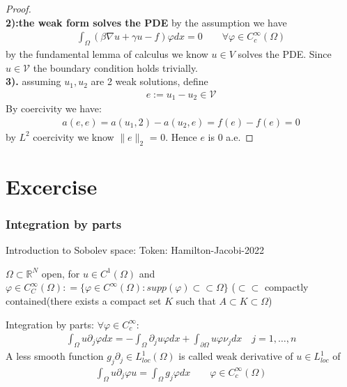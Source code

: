 \begin{proof}
\quad\\
\textbf{2):the weak form solves the PDE}
by the assumption we have
\begin{align*}
	\int_\Omega (\beta \nabla u + \gamma u - f) \varphi dx  = 0 \qquad \forall \varphi \in C_c^\infty(\Omega)
\end{align*}
by the fundamental lemma of calculus we know $u \in V$ solves the PDE. Since $u \in \mathcal{V}$ the boundary condition holds trivially. \\
\textbf{3).}
assuming $u_1, u_2$ are 2 weak solutions, define
\begin{align*}
	e:= u_1 - u_2 \in \mathcal{V}	
\end{align*}
By coercivity we have:
\begin{align*}
	a(e, e) = a(u_1, 2) - a(u_2, e) = f(e) - f(e) = 0
\end{align*}
by $L^2$ coercivity we know $\|e\|_2$ = 0. Hence $e$ is 0 a.e. 
\end{proof}



\section{Excercise}
\subsubsection*{Integration by parts}
Introduction to Sobolev space:
Token: Hamilton-Jacobi-2022
\begin{definition}
	$\Omega \subset \mathbb{R}^N$ open, for $u \in C^1(\Omega)$ and $\varphi \in C_C^\infty(\Omega) : = \{ \varphi \in C^\infty(\Omega): supp(\varphi) \subset\subset \Omega\}$ ($\subset\subset$ compactly contained(there exists a compact set $K$ such that $A \subset K \subset \Omega$)
\end{definition}
Integration by parts: $\forall \varphi \in C_c^\infty$:
\begin{align*}
	\int_{\Omega} u \partial_j \varphi dx = - \int_{\Omega} \partial_j u \varphi dx + \int_{\partial \Omega} u \varphi \nu_j dx \quad j = 1, \dots, n
\end{align*}
A less smooth function $g_j \partial_j \in L_{loc}^1(\Omega)$ is called weak derivative of $u \in L^1_{loc}$ of 
\begin{align*}
	\int_{\Omega} u \partial_j \varphi u = \int_{\Omega} g_j \varphi dx\qquad \varphi \in C_c^\infty(\Omega)
\end{align*}

